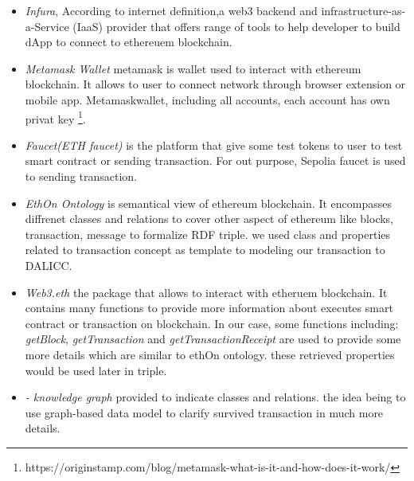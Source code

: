 \begin{itemize}
\item \textit{Infura}, According to internet definition,a web3 backend and infrastructure-as-a-Service (IaaS) provider that offers range of tools to help developer to build dApp to connect to ethereuem blockchain.
\item \textit{Metamask Wallet} metamask is wallet used to interact with ethereum blockchain. It allows to user to connect network through browser extension or mobile app. Metamaskwallet, including all accounts, each account has own privat key \footnote{https://originstamp.com/blog/metamask-what-is-it-and-how-does-it-work/}.
\item \textit{Faucet(ETH faucet)} is the platform that give some test tokens to user to test smart contract or sending transaction. For out purpose, Sepolia faucet is used to sending transaction. 
\item \textit{EthOn Ontology} is semantical view of ethereum blockchain. It encompasses diffrenet classes and relations to cover other aspect of ethereum like blocks, transaction, message to formalize RDF triple.  
we used class and properties related to transaction concept as template to modeling our transaction to DALICC. 
\item \textit{Web3.eth} the package that allows to interact with etheruem blockchain. It contains many functions to provide more information about executes smart contract or transaction on blockchain. 
In our case, some functions including: \textit{getBlock}, \textit{getTransaction} and \textit{getTransactionReceipt} are used to provide some more details which are similar to ethOn ontology. 
these retrieved properties would be used later in triple.
\item \textit{- knowledge graph} provided to indicate classes and relations.
the idea being to use graph-based data model to clarify survived transaction in much more details. 
\begin{center}
	
	\begin{figure}[htb!]
		
		\begin{minipage}{0.75\linewidth}
			

\end{minipage}
\end{figure}
\end{center}
\end{itemize}
